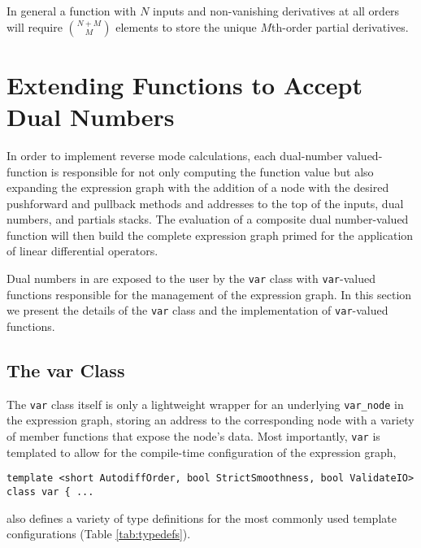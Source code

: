 In general a function with $N$ inputs and non-vanishing derivatives at
all orders will require $\binom{N + M}{M}$ elements to store the unique
$M$th-order partial derivatives.

\section{Extending Functions to Accept Dual Numbers}

In order to implement reverse mode calculations, each dual-number 
valued-function is responsible for not only computing the function
value but also expanding the expression graph with the addition of
a node with the desired pushforward and pullback methods and
addresses to the top of the inputs, dual numbers, and partials stacks.
The evaluation of a composite dual number-valued function will then
build the complete expression graph primed for the application of
linear differential operators.

Dual numbers in \nomad are exposed to the user by the \verb|var|
class with \verb|var|-valued functions responsible for the management
of the expression graph.  In this section we present the details of
the \verb|var| class and the implementation of \verb|var|-valued functions.

\subsection{The var Class}

The \verb|var| class itself is only a lightweight wrapper for an underlying 
\verb|var_node| in the expression graph, storing an address to the 
corresponding node with a variety of member functions that expose the 
node's data.  Most importantly, \verb|var| is templated to allow for the 
compile-time configuration of the expression graph,
%
\begin{verbatim}
template <short AutodiffOrder, bool StrictSmoothness, bool ValidateIO>
class var { ...
\end{verbatim}
%
\nomad also defines a variety of type definitions for the most commonly
used template configurations (Table \ref{tab:typedefs}).

